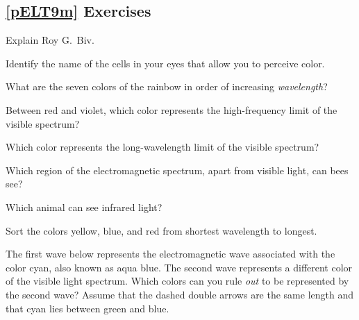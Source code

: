 \documentclass[main.tex]{subfiles}
\begin{document}
\subsection*{\ref{pELT9m} Exercises}

\begin{exercise}
    Explain Roy G.~Biv.
\end{exercise}

\begin{exercise}
    Identify the name of the cells in your eyes that allow you to perceive color.
\end{exercise}

\begin{exercise}
    What are the seven colors of the rainbow in order of increasing \textit{wavelength}?
\end{exercise}

\begin{exercise}
    Between red and violet, which color represents the high-frequency limit of the visible spectrum?
\end{exercise}

\begin{exercise}
    Which color represents the long-wavelength limit of the visible spectrum?
\end{exercise}

\begin{exercise}
    Which region of the electromagnetic spectrum, apart from visible light, can bees see?
\end{exercise}

\begin{exercise}
    Which animal can see infrared light?
\end{exercise}

\begin{exercise} \label{lwLSKO}
    Sort the colors yellow, blue, and red from shortest wavelength to longest.
\end{exercise}

\begin{exercise}
    The first wave below represents the electromagnetic wave associated with the color cyan, also known as aqua blue. The second wave represents a different color of the visible light spectrum. Which colors can you rule \textit{out} to be represented by the second wave? Assume that the dashed double arrows are the same length and that cyan lies between green and blue.
\end{exercise}
\end{document}
